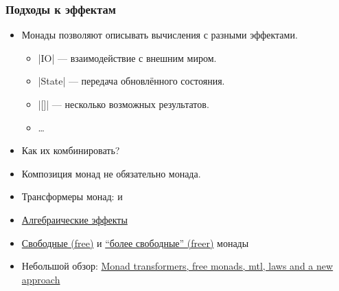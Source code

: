 \documentclass[11pt]{beamer}
\begin{document}
\begin{frame}[fragile]
  \frametitle{Подходы к эффектам}
  \begin{itemize}
    \item Монады позволяют описывать вычисления с разными эффектами.
          \begin{itemize}
            \item \haskinline|IO| — взаимодействие с внешним миром.
            \item \haskinline|State| — передача обновлённого состояния.
            \item \haskinline|[]| — несколько возможных результатов.
            \item \ldots
          \end{itemize}
          \pause
    \item Как их комбинировать?
    \item Композиция монад не обязательно монада.
          \pause
    \item Трансформеры монад:  и 
    \item \href{https://www.microsoft.com/en-us/research/wp-content/uploads/2016/08/algeff-tr-2016-v2.pdf}{Алгебраические эффекты}
    \item \href{https://haskellforall.com/2012/06/you-could-have-invented-free-monads}{Свободные (free)} и \href{https://okmij.org/ftp/Haskell/extensible/more.pdf}{\enquote{более свободные} (freer)} монады
    \item Небольшой обзор: \href{https://ocharles.org.uk/posts/2016-01-26-transformers-free-monads-mtl-laws.html}{Monad transformers, free monads, mtl, laws and a new approach}
  \end{itemize}
\end{frame}
\end{document}
